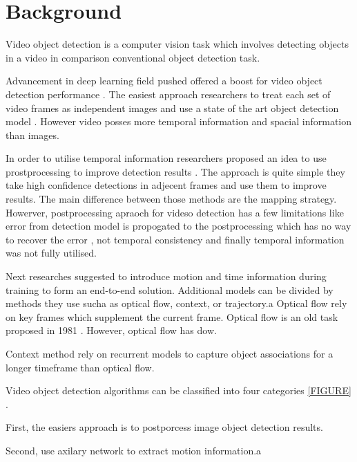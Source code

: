 \section{Background}  \label{Background}



Video object detection is a computer vision task which involves detecting objects in a video in comparison conventional object detection task.

Advancement in deep learning field pushed offered a boost for video object detection performance \cite{TODO}.
The easiest approach researchers to treat each set of video frames as independent images and use a state of the art object detection model \cite{TODO}. However video posses more temporal information and spacial information than images.

In order to utilise temporal information researchers proposed an idea to use prostprocessing to improve detection results \cite{TODO}. The approach is quite simple they take high confidence detections in adjecent frames and use them to improve results. The main difference between those methods are the mapping strategy. Howerver, postprocessing apraoch for videso detection has a few limitations like error from detection model is propogated to the postprocessing which has no way to recover the error \cite{}, not temporal consistency \cite{} and finally temporal information was not fully utilised.

Next researches suggested to introduce motion and time information during training to form an end-to-end solution. Additional models can be divided by methods they use sucha as optical flow, context, or trajectory.a
Optical flow rely on key frames which supplement the current frame. Optical flow is an old task proposed in 1981 \cite{TODO}. However, optical flow has dow.

Context method rely on recurrent models to capture object associations for a longer timeframe than optical flow.


Video object detection algorithms can be classified into four categories \ref{FIGURE} \cite{TODO}.

First, the easiers approach is to postporcess image object detection results.

Second, use axilary network to extract motion information.a


